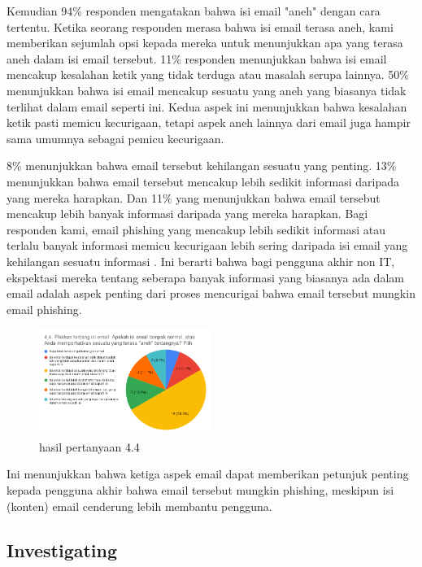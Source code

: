 \documentclass[lettersize,journal]{IEEEtran}
\begin{document}
Kemudian 94\% responden mengatakan bahwa isi email "aneh" dengan cara tertentu. 
Ketika seorang responden merasa bahwa isi email terasa aneh, kami memberikan
sejumlah opsi kepada mereka untuk menunjukkan apa yang terasa aneh dalam isi
email tersebut. 11\% responden menunjukkan bahwa isi email mencakup kesalahan
ketik yang tidak terduga atau masalah serupa lainnya. 50\% menunjukkan bahwa
isi email mencakup sesuatu yang aneh yang biasanya tidak terlihat dalam email
seperti ini. Kedua aspek ini menunjukkan bahwa kesalahan ketik pasti memicu
kecurigaan, tetapi aspek aneh lainnya dari email juga hampir sama umumnya sebagai
pemicu kecurigaan.

8\% menunjukkan bahwa email tersebut kehilangan sesuatu yang penting. 
13\% menunjukkan bahwa email tersebut mencakup lebih sedikit informasi daripada 
yang mereka harapkan. Dan 11\% yang menunjukkan bahwa email tersebut mencakup
lebih banyak informasi daripada yang mereka harapkan. Bagi responden kami, email
phishing yang mencakup lebih sedikit informasi atau terlalu banyak informasi memicu 
kecurigaan lebih sering daripada isi email yang kehilangan sesuatu informasi . 
Ini berarti bahwa bagi pengguna akhir non IT, ekspektasi mereka tentang seberapa 
banyak informasi yang biasanya ada dalam email adalah aspek
penting dari proses mencurigai bahwa email tersebut mungkin email phishing.

\begin{figure}[h!]
  \centering
  \includegraphics[width=0.5\textwidth]{image/4.4.png}
  \caption{hasil pertanyaan 4.4}
  \label{fig:pertanyaan_4.4}
\end{figure}

Ini menunjukkan bahwa
ketiga aspek email dapat memberikan petunjuk penting kepada pengguna akhir
bahwa email tersebut mungkin phishing, meskipun isi (konten) email cenderung
lebih membantu pengguna.

\subsection{Investigating}
\end{document}
